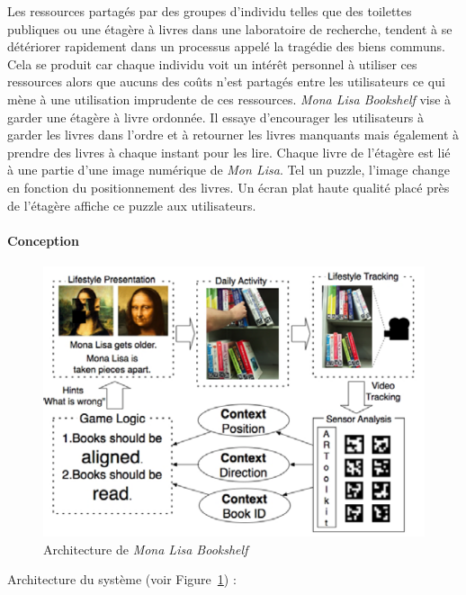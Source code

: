 \documentclass[10pt,a5paper,twoside]{article}
\begin{document}
Les ressources partagés par des groupes d'individu telles que des
toilettes publiques ou une étagère à livres dans une laboratoire de
recherche, tendent à se détériorer rapidement dans un processus appelé
la tragédie des biens communs. Cela se produit car chaque individu voit
un intérêt personnel à utiliser ces ressources alors que aucuns des
coûts n'est partagés entre les utilisateurs ce qui mène à une
utilisation imprudente de ces ressources. \emph{Mona Lisa Bookshelf}
vise à garder une étagère à livre ordonnée. Il essaye d'encourager les
utilisateurs à garder les livres dans l'ordre et à retourner les livres
manquants mais également à prendre des livres à chaque instant pour les
lire. Chaque livre de l'étagère est lié à une partie d'une image
numérique de \emph{Mon Lisa}. Tel un puzzle, l'image change en fonction
du positionnement des livres. Un écran plat haute qualité placé près de
l'étagère affiche ce puzzle aux utilisateurs.

\paragraph{Conception}\label{conception-1}

\begin{figure}
\centering
\includegraphics[]{images/monalisa-screenshot1.png}
\caption{Architecture de \emph{Mona Lisa
Bookshelf}}\label{fig:monalisa1}
\end{figure}

Architecture du système (voir Figure~\ref{fig:monalisa1}) :
\end{document}
